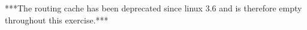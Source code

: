 ***The routing cache has been deprecated since linux 3.6 and is therefore empty throughout this exercise.***